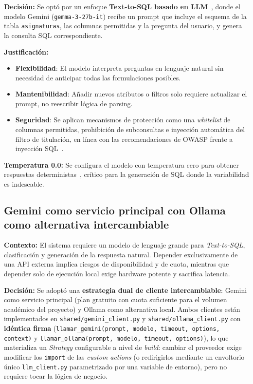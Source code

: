 \textbf{Decisión:} Se optó por un enfoque \textbf{Text-to-SQL basado en LLM}~\cite{yu2018spider}, donde el modelo Gemini (\texttt{gemma-3-27b-it}) recibe un prompt que incluye el esquema de la tabla \texttt{asignaturas}, las columnas permitidas y la pregunta del usuario, y genera la consulta SQL correspondiente.

\textbf{Justificación:}
\begin{itemize}
    \item \textbf{Flexibilidad}: El modelo interpreta preguntas en lenguaje natural sin necesidad de anticipar todas las formulaciones posibles.
    \item \textbf{Mantenibilidad}: Añadir nuevos atributos o filtros solo requiere actualizar el prompt, no reescribir lógica de parsing.
    \item \textbf{Seguridad}: Se aplican mecanismos de protección como una \textit{whitelist} de columnas permitidas, prohibición de subconsultas e inyección automática del filtro de titulación, en línea con las recomendaciones de OWASP frente a inyección SQL~\cite{owasp2021injection}.
\end{itemize}

\textbf{Temperatura 0.0:} Se configura el modelo con temperatura cero para obtener respuestas deterministas~\cite{holtzman2020curious}, crítico para la generación de SQL donde la variabilidad es indeseable.

\subsection{Gemini como servicio principal con Ollama como alternativa intercambiable}\label{subsec:dd-gemini-ollama}

\textbf{Contexto:} El sistema requiere un modelo de lenguaje grande para \textit{Text-to-SQL}, clasificación y generación de la respuesta natural. Depender exclusivamente de una API externa implica riesgos de disponibilidad y de cuota, mientras que depender solo de ejecución local exige hardware potente y sacrifica latencia.

\textbf{Decisión:} Se adoptó una \textbf{estrategia dual de cliente intercambiable}: Gemini como servicio principal (plan gratuito con cuota suficiente para el volumen académico del proyecto) y Ollama como alternativa local. Ambos clientes están implementados en \texttt{shared/gemini\_client.py} y \texttt{shared/ollama\_client.py} con \textbf{idéntica firma} (\texttt{llamar\_gemini(prompt, modelo, timeout, options, context)} y \texttt{llamar\_ollama(prompt, modelo, timeout, options)}), lo que materializa un \textit{Strategy} configurable a nivel de \textit{build}: cambiar el proveedor exige modificar los \texttt{import} de las \textit{custom actions} (o redirigirlos mediante un envoltorio único \texttt{llm\_client.py} parametrizado por una variable de entorno), pero no requiere tocar la lógica de negocio.

